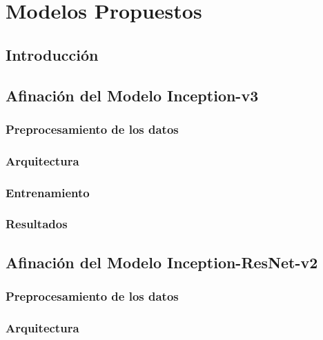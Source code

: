 \chapter{Modelos Propuestos} \label{Chapter:5}
\section{Introducción}

\section{Afinación del Modelo Inception-v3}
\subsection{Preprocesamiento de los datos}
\subsection{Arquitectura}


\subsection{Entrenamiento}

\subsection{Resultados}


\section{Afinación del Modelo Inception-ResNet-v2}

\subsection{Preprocesamiento de los datos}

\subsection{Arquitectura}

